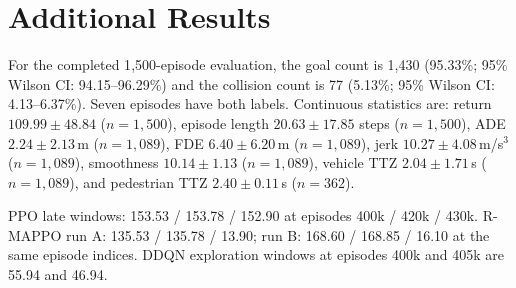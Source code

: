\documentclass{article}
\begin{document}
\section{Additional Results}
\label{app:additional}

For the completed 1{,}500-episode evaluation, the goal count is
1{,}430 (95.33\%; 95\% Wilson CI: 94.15--96.29\%) and the collision count is
77 (5.13\%; 95\% Wilson CI: 4.13--6.37\%). Seven episodes have both labels.
Continuous statistics are: return $109.99 \pm 48.84$ ($n=1{,}500$), episode
length $20.63 \pm 17.85$ steps ($n=1{,}500$), ADE
$2.24 \pm 2.13$\,m ($n=1{,}089$), FDE $6.40 \pm 6.20$\,m
($n=1{,}089$), jerk $10.27 \pm 4.08$\,m/s$^3$ ($n=1{,}089$), smoothness
$10.14 \pm 1.13$ ($n=1{,}089$), vehicle TTZ $2.04 \pm 1.71$\,s
($n=1{,}089$), and pedestrian TTZ $2.40 \pm 0.11$\,s ($n=362$).

PPO late windows: 153.53 / 153.78 / 152.90 at episodes 400k / 420k / 430k.
R-MAPPO run A: 135.53 / 135.78 / 13.90; run B: 168.60 / 168.85 / 16.10 at the
same episode indices. DDQN exploration windows at episodes 400k and 405k are
55.94 and 46.94.
\end{document}
